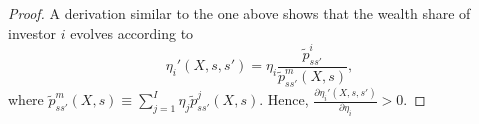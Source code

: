 \begin{proof}
A derivation similar to the one above shows that the wealth share of investor $i$ evolves according to
\begin{equation}
    \eta_i'(X,s,s') = \eta_i \frac{\tilde{p}^i_{ss'}}{\tilde{p}^m_{ss'}(X,s)},
\end{equation}
where $\tilde{p}^m_{ss'}(X,s) \equiv \sum_{j=1}^I \eta_j \tilde{p}^j_{ss'}(X,s)$.
Hence, $\frac{\partial \eta_i'(X,s,s')}{\partial \eta_i}  > 0$.








\end{proof}
